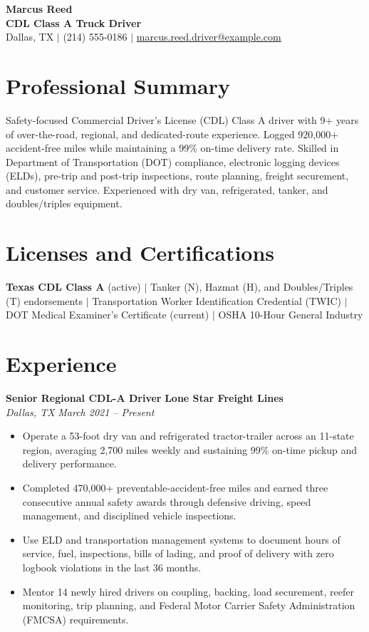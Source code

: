 \documentclass[10pt,letterpaper]{article}
\newcommand{\job}[4]{%
  \textbf{#1} \hfill \textbf{#2}\\[-0.1em]
  \textit{#3} \hfill \textit{#4}\vspace{-0.15em}
}
\begin{document}
\begin{center}
  {\huge\bfseries Marcus Reed}\\[0.18em]
  {\large\bfseries CDL Class A Truck Driver}\\[0.28em]
  Dallas, TX \enspace $\vert$ \enspace (214) 555-0186 \enspace $\vert$ \enspace
  \href{mailto:marcus.reed.driver@example.com}{marcus.reed.driver@example.com}
\end{center}
\vspace{-0.55em}

\section*{Professional Summary}
Safety-focused Commercial Driver's License (CDL) Class A driver with 9+ years of over-the-road, regional, and dedicated-route experience. Logged 920,000+ accident-free miles while maintaining a 99\% on-time delivery rate. Skilled in Department of Transportation (DOT) compliance, electronic logging devices (ELDs), pre-trip and post-trip inspections, route planning, freight securement, and customer service. Experienced with dry van, refrigerated, tanker, and doubles/triples equipment.

\section*{Licenses and Certifications}
\textbf{Texas CDL Class A} (active) \enspace $\vert$ \enspace Tanker (N), Hazmat (H), and Doubles/Triples (T) endorsements \enspace $\vert$ \enspace Transportation Worker Identification Credential (TWIC) \enspace $\vert$ \enspace DOT Medical Examiner's Certificate (current) \enspace $\vert$ \enspace OSHA 10-Hour General Industry

\section*{Experience}
\job{Senior Regional CDL-A Driver}{Lone Star Freight Lines}{Dallas, TX}{March 2021 -- Present}
\begin{itemize}
  \item Operate a 53-foot dry van and refrigerated tractor-trailer across an 11-state region, averaging 2,700 miles weekly and sustaining 99\% on-time pickup and delivery performance.
  \item Completed 470,000+ preventable-accident-free miles and earned three consecutive annual safety awards through defensive driving, speed management, and disciplined vehicle inspections.
  \item Use ELD and transportation management systems to document hours of service, fuel, inspections, bills of lading, and proof of delivery with zero logbook violations in the last 36 months.
  \item Mentor 14 newly hired drivers on coupling, backing, load securement, reefer monitoring, trip planning, and Federal Motor Carrier Safety Administration (FMCSA) requirements.
\end{itemize}
\end{document}

